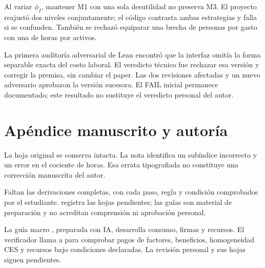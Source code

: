 \documentclass[11pt]{article}
\theoremstyle{definition}
\begin{document}
Al variar \(\phi_I\), mantener M1 con una sola desutilidad no preserva M3. El proyecto reajustó dos niveles conjuntamente; el código contrasta ambas estrategias y falla si se confunden. También se rechazó equiparar una brecha de personas por gasto con una de horas por activos.

La primera auditoría adversarial de Lean encontró que la interfaz omitía la forma separable exacta del costo laboral. El veredicto técnico fue rechazar esa versión y corregir la premisa, sin cambiar el paper. Las dos revisiones afectadas y un nuevo adversario aprobaron la versión sucesora. El FAIL inicial permanece documentado; este resultado no sustituye el veredicto personal del autor.

\section{Apéndice manuscrito y autoría}
La hoja original  se conserva intacta. La nota  identifica un subíndice incorrecto y un error en el cociente de horas. Esa errata tipografiada no constituye una corrección manuscrita del autor.

Faltan las derivaciones completas, con cada paso, regla y condición comprobados por el estudiante.  registra las hojas pendientes; las guías son material de preparación y no acreditan comprensión ni aprobación personal.

La guía macro , preparada con IA, desarrolla consumo, firmas y recursos. El verificador llama a  para comprobar pagos de factores, beneficios, homogeneidad CES y recursos bajo condiciones declaradas. La revisión personal y sus hojas siguen pendientes.
\end{document}
